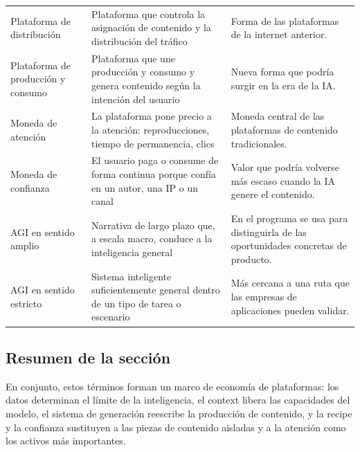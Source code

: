 \begin{longtable}{p{}p{}p{}}
Plataforma de distribución & Plataforma que controla la asignación de contenido y la distribución del tráfico & Forma de las plataformas de la internet anterior. \\
Plataforma de producción y consumo & Plataforma que une producción y consumo y genera contenido según la intención del usuario & Nueva forma que podría surgir en la era de la IA. \\
Moneda de atención & La plataforma pone precio a la atención: reproducciones, tiempo de permanencia, clics & Moneda central de las plataformas de contenido tradicionales. \\
Moneda de confianza & El usuario paga o consume de forma continua porque confía en un autor, una IP o un canal & Valor que podría volverse más escaso cuando la IA genere el contenido. \\
AGI en sentido amplio & Narrativa de largo plazo que, a escala macro, conduce a la inteligencia general & En el programa se usa para distinguirla de las oportunidades concretas de producto. \\
AGI en sentido estricto & Sistema inteligente suficientemente general dentro de un tipo de tarea o escenario & Más cercana a una ruta que las empresas de aplicaciones pueden validar. \\
\bottomrule
\end{longtable}

\subsection{Resumen de la sección}

En conjunto, estos términos forman un marco de economía de plataformas: los datos determinan el límite de la inteligencia, el context libera las capacidades del modelo, el sistema de generación reescribe la producción de contenido, y la recipe y la confianza sustituyen a las piezas de contenido aisladas y a la atención como los activos más importantes.
